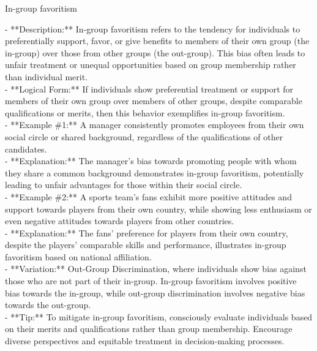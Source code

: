 \documentclass[a4paper,12pt,single,pdftex]{scrbook}
\begin{document}
In-group favoritism
    
      - **Description:** In-group favoritism refers to the tendency for individuals to preferentially support, favor, or give benefits to members of their own group (the in-group) over those from other groups (the out-group). This bias often leads to unfair treatment or unequal opportunities based on group membership rather than individual merit.
    \\

    
      - **Logical Form:** If individuals show preferential treatment or support for members of their own group over members of other groups, despite comparable qualifications or merits, then this behavior exemplifies in-group favoritism.
    \\

    
      - **Example \#1:** A manager consistently promotes employees from their own social circle or shared background, regardless of the qualifications of other candidates.
    \\

    
      - **Explanation:** The manager’s bias towards promoting people with whom they share a common background demonstrates in-group favoritism, potentially leading to unfair advantages for those within their social circle.
    \\

    
      - **Example \#2:** A sports team’s fans exhibit more positive attitudes and support towards players from their own country, while showing less enthusiasm or even negative attitudes towards players from other countries.
    \\

    
      - **Explanation:** The fans’ preference for players from their own country, despite the players’ comparable skills and performance, illustrates in-group favoritism based on national affiliation.
    \\

    
      - **Variation:** Out-Group Discrimination, where individuals show bias against those who are not part of their in-group. In-group favoritism involves positive bias towards the in-group, while out-group discrimination involves negative bias towards the out-group.
    \\

    
      - **Tip:** To mitigate in-group favoritism, consciously evaluate individuals based on their merits and qualifications rather than group membership. Encourage diverse perspectives and equitable treatment in decision-making processes.
    \\
\end{document}
